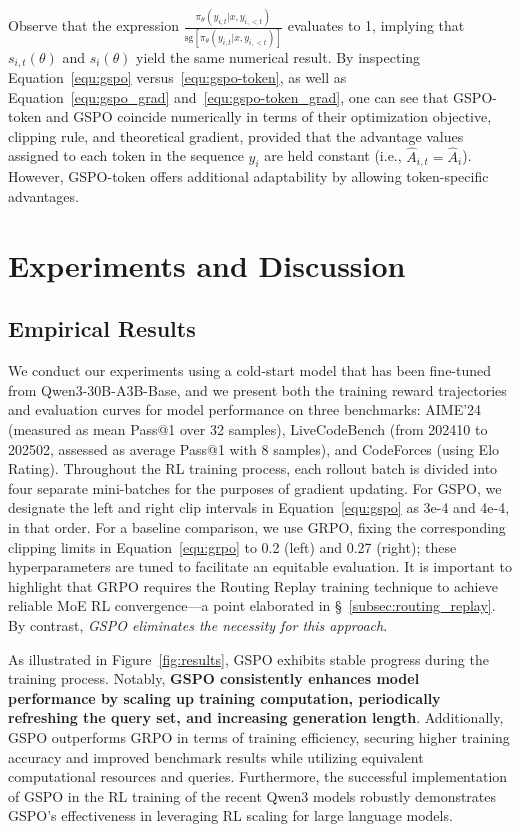 Observe that the expression $\frac{ \pi_{\theta} (y_{i,t} | x, y_{i,<t}) }{ \mathrm{sg} \left[ \pi_{\theta} (y_{i,t} | x, y_{i,<t}) \right] }$ evaluates to 1, implying that $s_{i,t}(\theta)$ and $s_{i}(\theta)$ yield the same numerical result. By inspecting Equation~\eqref{equ:gspo} versus~\eqref{equ:gspo-token}, as well as Equation~\eqref{equ:gspo_grad} and~\eqref{equ:gspo-token_grad}, one can see that GSPO-token and GSPO coincide numerically in terms of their optimization objective, clipping rule, and theoretical gradient, provided that the advantage values assigned to each token in the sequence $y_i$ are held constant (i.e., $\widehat{A}_{i,t} = \widehat{A}_{i}$). However, GSPO-token offers additional adaptability by allowing token-specific advantages.

\section{Experiments and Discussion}

\subsection{Empirical Results}

We conduct our experiments using a cold-start model that has been fine-tuned from Qwen3-30B-A3B-Base, and we present both the training reward trajectories and evaluation curves for model performance on three benchmarks: AIME'24 (measured as mean Pass@1 over 32 samples), LiveCodeBench (from 202410 to 202502, assessed as average Pass@1 with 8 samples), and CodeForces (using Elo Rating). Throughout the RL training process, each rollout batch is divided into four separate mini-batches for the purposes of gradient updating. For GSPO, we designate the left and right clip intervals in Equation~\eqref{equ:gspo} as 3e-4 and 4e-4, in that order. For a baseline comparison, we use GRPO, fixing the corresponding clipping limits in Equation~\eqref{equ:grpo} to 0.2 (left) and 0.27 (right); these hyperparameters are tuned to facilitate an equitable evaluation. It is important to highlight that GRPO requires the Routing Replay training technique to achieve reliable MoE RL convergence—a point elaborated in \S~\ref{subsec:routing_replay}. By contrast, \textit{GSPO eliminates the necessity for this approach}.

As illustrated in Figure~\ref{fig:results}, GSPO exhibits stable progress during the training process. Notably, \textbf{GSPO consistently enhances model performance by scaling up training computation, periodically refreshing the query set, and increasing generation length}. Additionally, GSPO outperforms GRPO in terms of training efficiency, securing higher training accuracy and improved benchmark results while utilizing equivalent computational resources and queries. Furthermore, the successful implementation of GSPO in the RL training of the recent Qwen3 models robustly demonstrates GSPO’s effectiveness in leveraging RL scaling for large language models.

